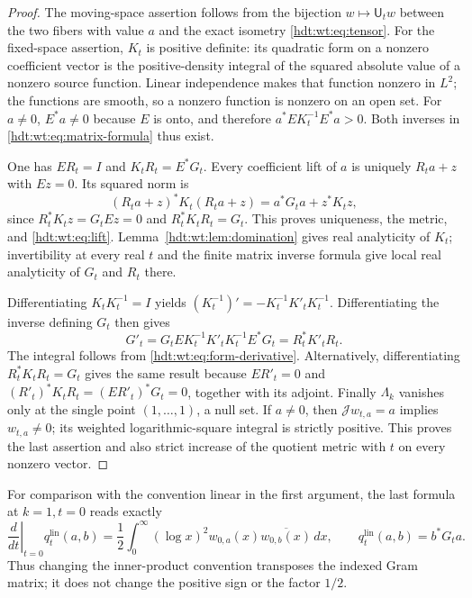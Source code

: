 \begin{proof}
The moving-space assertion follows from the bijection
$w\mapsto\mathsf U_tw$ between the two fibers with value $a$
and the exact isometry \eqref{hdt:wt:eq:tensor}.
For the fixed-space assertion, $K_t$ is positive definite:
its quadratic form on a nonzero coefficient vector is the
positive-density integral of the squared absolute value of a
nonzero source function.  Linear independence makes that function
nonzero in $L^2$; the functions are smooth, so a nonzero function
is nonzero on an open set.  For $a\ne0$, $E^*a\ne0$ because
$E$ is onto, and therefore
$a^*EK_t^{-1}E^*a>0$.  Both inverses in
\eqref{hdt:wt:eq:matrix-formula} thus exist.

One has $ER_t=I$ and $K_tR_t=E^*G_t$.  Every coefficient lift
of $a$ is uniquely $R_ta+z$ with $Ez=0$.  Its squared norm is
\[
 (R_ta+z)^*K_t(R_ta+z)=a^*G_ta+z^*K_tz,
\]
since $R_t^*K_tz=G_tEz=0$ and
$R_t^*K_tR_t=G_t$.  This proves uniqueness, the metric, and
\eqref{hdt:wt:eq:lift}.  Lemma~\ref{hdt:wt:lem:domination} gives real
analyticity of $K_t$; invertibility at every real $t$ and the
finite matrix inverse formula give local real analyticity of
$G_t$ and $R_t$ there.

Differentiating $K_tK_t^{-1}=I$ yields
$(K_t^{-1})'=-K_t^{-1}K'_tK_t^{-1}$.  Differentiating the
inverse defining $G_t$ then gives
\[
 G'_t=G_tEK_t^{-1}K'_tK_t^{-1}E^*G_t=R_t^*K'_tR_t.
\]
The integral follows from \eqref{hdt:wt:eq:form-derivative}.
Alternatively, differentiating $R_t^*K_tR_t=G_t$ gives the
same result because $ER'_t=0$ and
$(R'_t)^*K_tR_t=(ER'_t)^*G_t=0$, together with its adjoint.
Finally $\Lambda_k$ vanishes only at the single point
$(1,\ldots,1)$, a null set.  If $a\ne0$, then
$\mathcal Jw_{t,a}=a$ implies $w_{t,a}\ne0$; its weighted
logarithmic-square integral is strictly positive.  This proves
the last assertion and also strict increase of the quotient
metric with $t$ on every nonzero vector.
\end{proof}

For comparison with the convention linear in the first argument,
the last formula at $k=1,t=0$ reads exactly
\begin{equation}\label{hdt:wt:eq:linear-first}
 \left.\frac d{dt}\right|_{t=0}q_t^{\mathrm{lin}}(a,b)
 =\frac12\int_0^\infty(\log x)^2w_{0,a}(x)
                         \overline{w_{0,b}(x)}\,dx,
 \qquad q_t^{\mathrm{lin}}(a,b)=b^*G_ta.
\end{equation}
Thus changing the inner-product convention transposes the indexed
Gram matrix; it does not change the positive sign or the factor
$1/2$.

